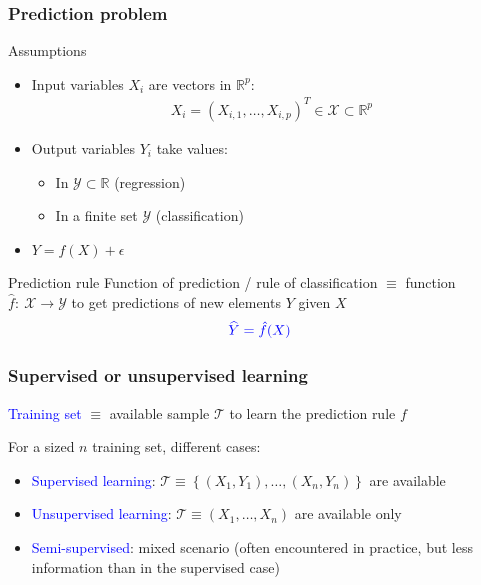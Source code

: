 \documentclass[pressentation,9pt,aspectratio=1610,xcolor=table]{beamer}
\newcommand{\structuretext}[1]{{\textcolor{blue}{#1}}}
\begin{document}
\begin{frame}
  \frametitle{Prediction problem}
  \begin{block}{Assumptions}
    \begin{itemize}
    \item Input variables $X_i$ are vectors in $\mathbb{R}^p$:
      \begin{align*}
        X_i= \left(X_{i,1}, \ldots, X_{i,p} \right)^T \in \mathcal{X} \subset \mathbb{R}^p
      \end{align*}
    \item Output variables $Y_i$ take values:
      \begin{itemize}
      \item In $\mathcal{Y \subset \mathbb{R}}$ (regression)
      \item In a finite set $\mathcal{Y}$ (classification)
      \end{itemize}
    \item \(Y = f(X) + \epsilon\)
    \end{itemize}
  \end{block}
  \begin{block}{Prediction rule}
    Function of prediction / rule of classification $\equiv$ function $\hat{f}: \  \mathcal{X} \rightarrow \mathcal{Y}$  to
    get  predictions of new elements $Y$ given $X$
     $$\structuretext{\widehat{Y}=\hat{f}(X)}$$
  \end{block}
\end{frame}

\begin{frame}
  \frametitle{Supervised or unsupervised learning}

  \structuretext{Training set} $\equiv$ available sample  $\mathcal{T}$ to learn the prediction rule $f$ \medskip

  For a sized $n$ training set, different cases:
  \begin{itemize}
  \item \structuretext{Supervised learning}:  $ \mathcal{T} \equiv \left\{ (X_1,Y_1), \ldots, (X_n,Y_n) \right\}$ are available
  \item \structuretext{Unsupervised learning}: $ \mathcal{T} \equiv \left( X_1, \ldots, X_n \right)$ are available only
  \item \structuretext{Semi-supervised}: mixed scenario (often encountered in practice, but less information than in the supervised case)
  \end{itemize}
\end{frame}
\end{document}
